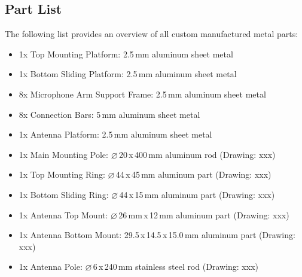 \subsection{Part List}
The following list provides an overview of all custom manufactured metal parts:
\begin{itemize}
	\item 1x Top Mounting Platform: 2.5\,mm aluminum sheet metal
	\item 1x Bottom Sliding Platform: 2.5\,mm aluminum sheet metal
	\item 8x Microphone Arm Support Frame: 2.5\,mm aluminum sheet metal
	\item 8x Connection Bars: 5\,mm aluminum sheet metal
	\item 1x Antenna Platform: 2.5\,mm aluminum sheet metal
	\item 1x Main Mounting Pole: $\varnothing$\,20\,x\,400\,mm aluminum rod (Drawing: xxx)
	\item 1x Top Mounting Ring: $\varnothing$\,44\,x\,45\,mm aluminum part (Drawing: xxx)
	\item 1x Bottom Sliding Ring: $\varnothing$\,44\,x\,15\,mm aluminum part (Drawing: xxx)
	\item 1x Antenna Top Mount: $\varnothing$\,26\,mm\,x\,12\,mm aluminum part (Drawing: xxx)
	\item 1x Antenna Bottom Mount: 29.5\,x\,14.5\,x\,15.0\,mm aluminum part (Drawing: xxx)
	\item 1x Antenna Pole: $\varnothing$\,6\,x\,240\,mm stainless steel rod (Drawing: xxx) 
\end{itemize}

